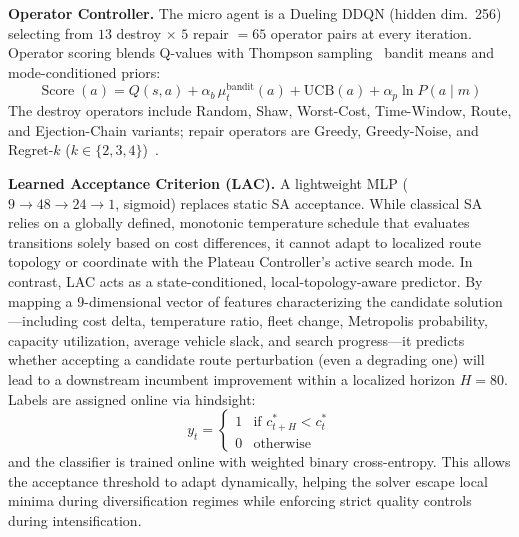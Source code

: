 \documentclass[journal]{IEEEtran}
\begin{document}
\textbf{Operator Controller.}
The micro agent is a Dueling DDQN (hidden dim.\ 256) selecting from
$13$ destroy $\times$ $5$ repair $= 65$ operator pairs at every
iteration.  Operator scoring blends Q-values with Thompson
sampling~\cite{thompson1933likelihood} bandit means and mode-conditioned
priors:
\begin{equation}
  \operatorname{Score}(a) = Q(s,a) + \alpha_b\,\mu_t^{\text{bandit}}(a)
    + \text{UCB}(a) + \alpha_p\ln P(a \mid m)
  \label{eq:score}
\end{equation}
The destroy operators include Random, Shaw, Worst-Cost, Time-Window, Route,
and Ejection-Chain variants; repair operators are Greedy, Greedy-Noise,
and Regret-$k$ ($k\!\in\!\{2,3,4\}$)~\cite{pisinger2007general}.

\textbf{Learned Acceptance Criterion (LAC).}
A lightweight MLP ($9{\to}48{\to}24{\to}1$, sigmoid) replaces static SA acceptance.
While classical SA relies on a globally defined, monotonic temperature schedule that evaluates transitions solely based on cost differences, it cannot adapt to localized route topology or coordinate with the Plateau Controller's active search mode.
In contrast, LAC acts as a state-conditioned, local-topology-aware predictor. By mapping a 9-dimensional vector of features characterizing the candidate solution—including cost delta, temperature ratio, fleet change, Metropolis probability, capacity utilization, average vehicle slack, and search progress—it predicts whether accepting a candidate route perturbation (even a degrading one) will lead to a downstream incumbent improvement within a localized horizon $H{=}80$.
Labels are assigned online via hindsight:
\begin{equation}
  y_t = \begin{cases}
    1 & \text{if } c^*_{t+H} < c^*_t \\
    0 & \text{otherwise}
  \end{cases}
  \label{eq:lac}
\end{equation}
and the classifier is trained online with weighted binary cross-entropy. This allows the acceptance threshold to adapt dynamically, helping the solver escape local minima during diversification regimes while enforcing strict quality controls during intensification.
\end{document}
